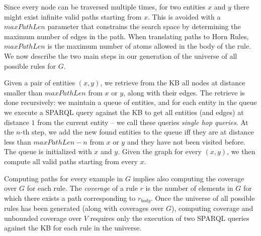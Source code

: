 Since every node can be traversed multiple times, for two entities $x$ and $y$ there might exist infinite valid paths starting from $x$. This is avoided with a $maxPathLen$ parameter that constrains the search space by determining the maximum number of edges in the path. When translating paths to Horn Rules, $maxPathLen$ is the maximum number of atoms allowed in the body of the rule. 
We now describe the two main steps in our generation of the universe of all possible rules for $G$. 

\noindent {}
Given a pair of entities $(x,y)$, we retrieve from the KB all nodes at distance smaller than $maxPathLen$ from $x$ or $y$, along with their edges. The retrieve is done recursively: we maintain a queue of entities, and for each entity in the queue we execute a SPARQL query against the KB to get all entities (and edges) at distance $1$ from the current entity -- we call these queries \emph{single hop queries}. At the $n$-th step, we add the new found entities to the queue iff they are at distance less than $maxPathLen-n$ from $x$ or $y$ and they have not been visited before. The queue is initialized with $x$ and $y$. 
%
Given the graph for every $(x,y)$, we then compute all valid paths starting from every $x$. 

\noindent {}
Computing paths for every example in $G$ implies also computing the coverage over $G$ for each rule. The {\em coverage} of a rule $r$ is the number of elements in $G$ for which there exists a path corresponding to $r_{body}$. 
%
%
Once the universe of all possible rules has been generated (along with coverages over $G$), computing coverage and unbounded coverage over $V$ requires only the execution of two SPARQL queries against the KB for each rule in the universe.

